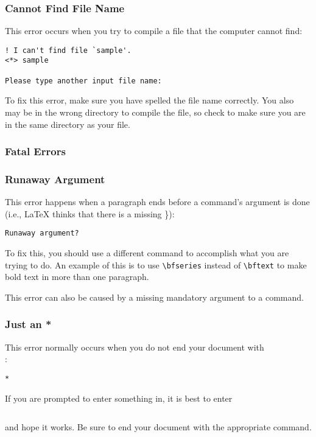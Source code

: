 \subsubsection{Cannot Find File Name}
\label{sec:cannot-find-file}

This error occurs when you try to compile a file that the computer
cannot find:
\begin{verbatim}
! I can't find file `sample'.
<*> sample

Please type another input file name:
\end{verbatim}

To fix this error, make sure you have spelled the file name
correctly.  You also may be in the wrong directory to compile the
file, so check to make sure you are in the same directory as your
file.

\subsubsection{Fatal Errors}
\label{sec:fatal-errors}

\subsubsection{Runaway Argument}
\label{sec:runaway-argument}

This error happens when a paragraph ends before a command's argument
is done (i.e., \LaTeX{} thinks that there is a missing \}):
\begin{verbatim}
Runaway argument?
\end{verbatim}

To fix this, you should use a different command to accomplish what you
are trying to do.  An example of this is to use \verb|\bfseries|
instead of \verb|\bftext| to make bold text in more than one
paragraph.

This error can also be caused by a missing mandatory argument to a
command.

\subsubsection{Just an *}
\label{sec:just-an-asterisk}

This error normally occurs when you do not end your document with \\ \verb||:
\begin{verbatim}
*
\end{verbatim}

If you are prompted to enter something in, it is best to enter
\begin{verbatim}

\end{verbatim}
and hope it works.  Be sure to end your document
with the appropriate command.

